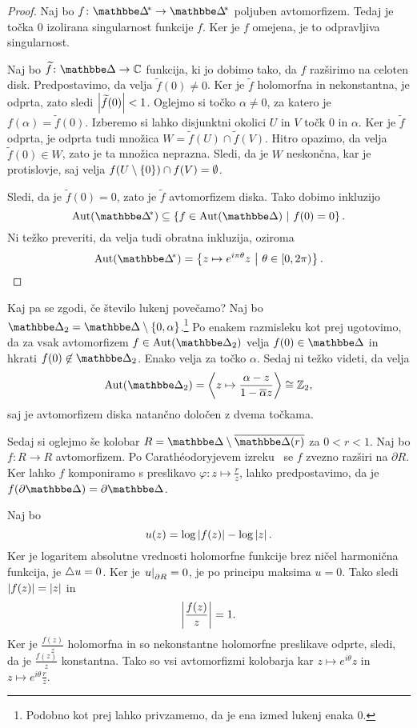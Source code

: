 \begin{proof}
Naj bo $f \colon \dskx \to \dskx$ poljuben avtomorfizem. Tedaj je
točka $0$ izolirana singularnost funkcije $f$. Ker je $f$ omejena,
je to odpravljiva singularnost.

Naj bo $\widetilde{f} \colon \dsk \to \C$ funkcija, ki jo dobimo
tako, da $f$ razširimo na celoten disk. Predpostavimo, da velja
$\widetilde{f}(0) \ne 0$. Ker je $\widetilde{f}$ holomorfna in
nekonstantna, je odprta, zato sledi $\left\lvert \widetilde{f}(0)\right\rvert < 1$.
Oglejmo si točko $\alpha \ne 0$, za katero je
$f(\alpha) = \widetilde{f}(0)$. Izberemo si lahko disjunktni
okolici $U$ in $V$ točk $0$ in $\alpha$. Ker je $\widetilde{f}$
odprta, je odprta tudi množica
$W = \widetilde{f}(U) \cap \widetilde{f}(V)$. Hitro opazimo, da
velja $\widetilde{f}(0) \in W$, zato je ta množica neprazna.
Sledi, da je $W$ neskončna, kar je protislovje, saj velja
$f(U \setminus \left\{0\right\}) \cap f(V) = \emptyset$.

Sledi, da je $\widetilde{f}(0) = 0$, zato je $\widetilde{f}$
avtomorfizem diska. Tako dobimo inkluzijo
\[
\Aut(\dskx) \subseteq \setb{f \in \Aut(\dsk)}{f(0) = 0}.
\]
Ni težko preveriti, da velja tudi obratna inkluzija, oziroma
\[
\Aut(\dskx) =
\setb{z \mapsto e^{i \pi \theta} z}{\theta \in [0, 2\pi)}.
\qedhere
\]
\end{proof}

Kaj pa se zgodi, če število lukenj povečamo? Naj bo
$\dsk_2 = \dsk \setminus \set{0, \alpha}$.\footnote{Podobno kot
prej lahko privzamemo, da je ena izmed lukenj enaka $0$.} Po
enakem razmisleku kot prej ugotovimo, da za vsak avtomorfizem
$f \in \Aut(\dsk_2)$ velja $f(0) \in \dsk$ in hkrati
$f(0) \not \in \dsk_2$. Enako velja za točko $\alpha$. Sedaj ni
težko videti, da velja
\[
\Aut(\dsk_2) =
\skl{z \mapsto \frac{\alpha - z}{1 - \oline{\alpha} z}} \cong
\Z_2,
\]
saj je avtomorfizem diska natančno določen z dvema točkama.

Sedaj si oglejmo še kolobar $R = \dsk \setminus \oline{\dsk(r)}$ za
$0 < r < 1$. Naj bo $f \colon R \to R$ avtomorfizem. Po
Carathéodoryjevem izreku~\cite[izrek~5.1.1 in opomba~5.1.2]{krantz}
se $f$ zvezno razširi na $\partial R$. Ker lahko $f$ komponiramo s
preslikavo $\varphi \colon z \mapsto \frac{r}{z}$, lahko
predpostavimo, da je $f(\partial \dsk) = \partial \dsk$.

Naj bo
\[
u(z) = \log \left\lvert f(z)\right\rvert - \log \left\lvert z\right\rvert.
\]
Ker je logaritem absolutne vrednosti holomorfne funkcije brez ničel
harmonična funkcija, je $\mathop{}\!\mathbin\bigtriangleup u = 0$. Ker je
$\left. u\right|_{\partial R}^{} = 0$, je po principu maksima $u = 0$. Tako
sledi $\left\lvert f(z)\right\rvert = \left\lvert z\right\rvert$ in
\[
\left\lvert \frac{f(z)}{z}\right\rvert = 1.
\]
Ker je $\frac{f(z)}{z}$ holomorfna in so nekonstantne holomorfne
preslikave odprte, sledi, da je $\frac{f(z)}{z}$ konstantna. Tako
so vsi avtomorfizmi kolobarja kar $z \mapsto e^{i \theta} z$ in
$z \mapsto e^{i \theta} \frac{r}{z}$.

